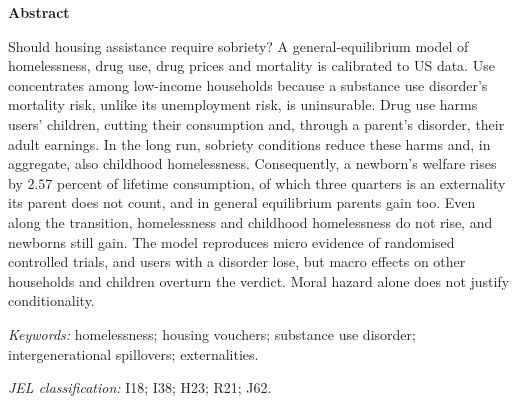 \documentclass[12pt]{article}
\begin{document}
\vspace{1.5em}
\begin{center}
\begin{minipage}{0.88\textwidth}
\begin{center}\textbf{Abstract}\end{center}
\noindent Should housing assistance require sobriety? A general-equilibrium model of homelessness, drug use, drug prices and mortality is calibrated to US data. Use concentrates among low-income households because a substance use disorder's mortality risk, unlike its unemployment risk, is uninsurable. Drug use harms users' children, cutting their consumption and, through a parent's disorder, their adult earnings. In the long run, sobriety conditions reduce these harms and, in aggregate, also childhood homelessness. Consequently, a newborn's welfare rises by $2.57$ percent of lifetime consumption, of which three quarters is an externality its parent does not count, and in general equilibrium parents gain too. Even along the transition, homelessness and childhood homelessness do not rise, and newborns still gain. The model reproduces micro evidence of randomised controlled trials, and users with a disorder lose, but macro effects on other households and children overturn the verdict. Moral hazard alone does not justify conditionality.

\vspace{1em}
\noindent\textit{Keywords:} homelessness; housing vouchers; substance use disorder; intergenerational spillovers; externalities.

\vspace{0.4em}
\noindent\textit{JEL classification:} I18; I38; H23; R21; J62.
\end{minipage}
\end{center}
\end{document}
